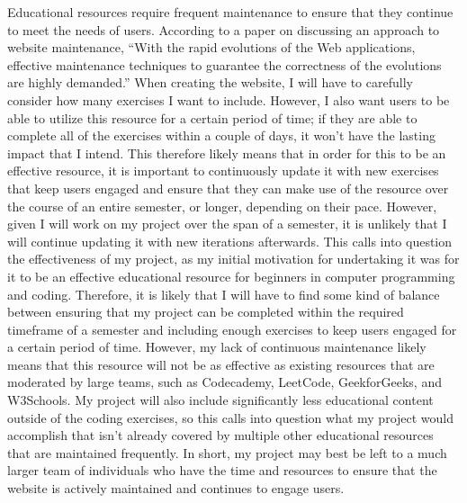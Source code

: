 \documentclass[10pt,twocolumn]{article}
\begin{document}
Educational resources require frequent maintenance to ensure that they continue to meet the needs of users. According to a paper on discussing an approach to website maintenance, “With the rapid evolutions of the Web applications, effective maintenance techniques to guarantee the correctness of the evolutions are highly demanded.”\cite{Maintenance} When creating the website, I will have to carefully consider how many exercises I want to include. However, I also want users to be able to utilize this resource for a certain period of time; if they are able to complete all of the exercises within a couple of days, it won’t have the lasting impact that I intend. This therefore likely means that in order for this to be an effective resource, it is important to continuously update it with new exercises that keep users engaged and ensure that they can make use of the resource over the course of an entire semester, or longer, depending on their pace. However, given I will work on my project over the span of a semester, it is unlikely that I will continue updating it with new iterations afterwards. This calls into question the effectiveness of my project, as my initial motivation for undertaking it was for it to be an effective educational resource for beginners in computer programming and coding. Therefore, it is likely that I will have to find some kind of balance between ensuring that my project can be completed within the required timeframe of a semester and including enough exercises to keep users engaged for a certain period of time. However, my lack of continuous maintenance likely means that this resource will not be as effective as existing resources that are moderated by large teams, such as Codecademy, LeetCode, GeekforGeeks, and W3Schools. My project will also include significantly less educational content outside of the coding exercises, so this calls into question what my project would accomplish that isn’t already covered by multiple other educational resources that are maintained frequently. In short, my project may best be left to a much larger team of individuals who have the time and resources to ensure that the website is actively maintained and continues to engage users. 
\end{document}
